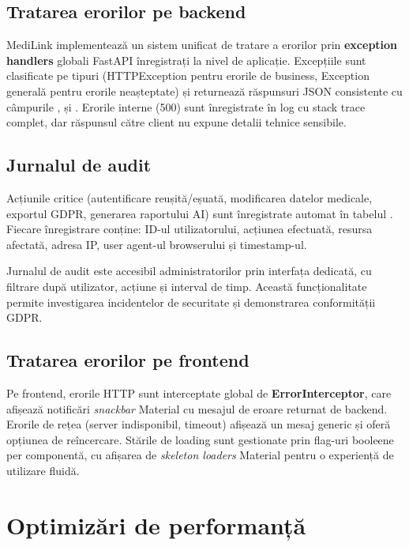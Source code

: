 \subsection{Tratarea erorilor pe backend}

MediLink implementează un sistem unificat de tratare a erorilor prin \textbf{exception handlers} globali FastAPI înregistrați la nivel de aplicație. Excepțiile sunt clasificate pe tipuri (HTTPException pentru erorile de business, Exception generală pentru erorile neașteptate) și returnează răspunsuri JSON consistente cu câmpurile ,  și . Erorile interne (500) sunt înregistrate în log cu stack trace complet, dar răspunsul către client nu expune detalii tehnice sensibile.

\subsection{Jurnalul de audit}

Acțiunile critice (autentificare reușită/eșuată, modificarea datelor medicale, exportul GDPR, generarea raportului AI) sunt înregistrate automat în tabelul . Fiecare înregistrare conține: ID-ul utilizatorului, acțiunea efectuată, resursa afectată, adresa IP, user agent-ul browserului și timestamp-ul.

Jurnalul de audit este accesibil administratorilor prin interfața dedicată, cu filtrare după utilizator, acțiune și interval de timp. Această funcționalitate permite investigarea incidentelor de securitate și demonstrarea conformității GDPR.

\subsection{Tratarea erorilor pe frontend}

Pe frontend, erorile HTTP sunt interceptate global de \textbf{ErrorInterceptor}, care afișează notificări \textit{snackbar} Material cu mesajul de eroare returnat de backend. Erorile de rețea (server indisponibil, timeout) afișează un mesaj generic și oferă opțiunea de reîncercare. Stările de loading sunt gestionate prin flag-uri booleene per componentă, cu afișarea de \textit{skeleton loaders} Material pentru o experiență de utilizare fluidă.

\section{Optimizări de performanță}

